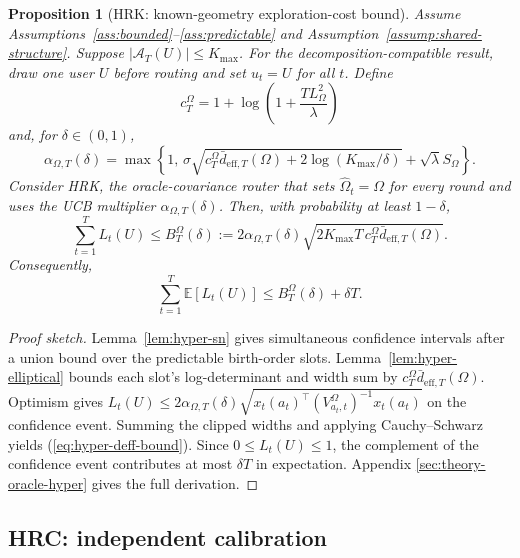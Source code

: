 \documentclass{article} %
\newtheorem{proposition}[theorem]{Proposition}
\renewcommand{\eqref}[1]{\textup{(\ref{#1})}}
\begin{document}
\begin{proposition}[HRK: known-geometry exploration-cost bound]
\label{prop:deff-bound}
Assume Assumptions~\ref{ass:bounded}--\ref{ass:predictable} and
Assumption~\ref{assump:shared-structure}. Suppose
$|\mathcal A_T(U)|\le K_{\max}$. For the decomposition-compatible result,
draw one user \(U\) before routing and set \(u_t=U\) for all \(t\). Define
\begin{equation}
\label{eq:hyper-ct}
c_T^\Omega
=
1+\log\!\left(1+\frac{TL_\Omega^2}{\lambda}\right)
\end{equation}
and, for $\delta\in(0,1)$,
\begin{equation}
\label{eq:hyper-alpha-main}
\alpha_{\Omega,T}(\delta)
=
\max\!\left\{
1,\,
\sigma\sqrt{
c_T^\Omega\bar d_{\mathrm{eff},T}(\Omega)
+2\log(K_{\max}/\delta)}
+\sqrt{\lambda}S_\Omega
\right\}.
\end{equation}
Consider HRK, the oracle-covariance router that sets $\widehat\Omega_t=\Omega$ for every round
and uses the UCB multiplier $\alpha_{\Omega,T}(\delta)$. Then, with
probability at least $1-\delta$,
\begin{equation}
\label{eq:hyper-deff-bound}
\sum_{t=1}^{T}L_t(U)
\le
B_T^\Omega(\delta)
:=
2\alpha_{\Omega,T}(\delta)
\sqrt{
2K_{\max}T\,c_T^\Omega
\bar d_{\mathrm{eff},T}(\Omega)
}.
\end{equation}
Consequently,
\begin{equation}
\label{eq:hyper-deff-bound-expect-main}
\sum_{t=1}^{T}\mathbb{E}[L_t(U)]
\le
B_T^\Omega(\delta)+\delta T.
\end{equation}
\end{proposition}

\begin{proof}[Proof sketch]
Lemma~\ref{lem:hyper-sn} gives simultaneous confidence intervals after a
union bound over the predictable birth-order slots. Lemma~\ref{lem:hyper-elliptical}
bounds each slot's log-determinant and width sum by
$c_T^\Omega\bar d_{\mathrm{eff},T}(\Omega)$. Optimism gives
$L_t(U)\le2\alpha_{\Omega,T}(\delta)
\sqrt{x_t(a_t)^\top(V_{a_t,t}^{\Omega})^{-1}x_t(a_t)}$ on the confidence
event. Summing the clipped widths and applying Cauchy--Schwarz yields
\eqref{eq:hyper-deff-bound}. Since $0\le L_t(U)\le1$, the complement of the
confidence event contributes at most $\delta T$ in expectation. Appendix
\ref{sec:theory-oracle-hyper} gives the full derivation.
\end{proof}

\subsection{HRC: independent calibration}
\end{document}
